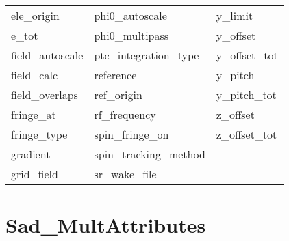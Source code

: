 \begin{tabular}{lll}
ele_origin                  & phi0_autoscale              & y_limit                     \\
e_tot                       & phi0_multipass              & y_offset                    \\
field_autoscale             & ptc_integration_type        & y_offset_tot                \\
field_calc                  & reference                   & y_pitch                     \\
field_overlaps              & ref_origin                  & y_pitch_tot                 \\
fringe_at                   & rf_frequency                & z_offset                    \\
fringe_type                 & spin_fringe_on              & z_offset_tot                \\
gradient                    & spin_tracking_method        &                             \\
grid_field                  & sr_wake_file                &                             \\
 \bottomrule
 \end{tabular}
 \vfill
 
 \section{Sad_MultAttributes}
 \label{s:list.sad.mult}
 

